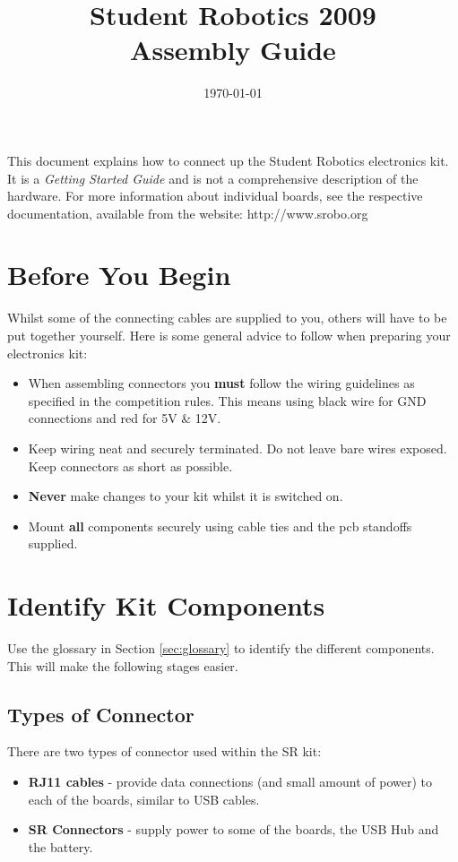\documentclass[a4paper, 12pt]{article}
\title {Student Robotics 2009\\ Assembly Guide}
\date{\today}
\begin{document}
\maketitle

\noindent This document explains how to connect up the Student Robotics electronics kit. It is a \textit{Getting Started Guide} and is not a comprehensive description of the hardware. For more information about individual boards, see the respective documentation, available from the website: http://www.srobo.org 

\section{Before You Begin}

Whilst some of the connecting cables are supplied to you, others will have to be put together yourself. Here is some general advice to follow when preparing your electronics kit:
\begin{itemize}
\item When assembling connectors you \textbf{must} follow the wiring guidelines as specified in the competition rules. This means using black wire for GND connections and red for 5V \& 12V. 
\item Keep wiring neat and securely terminated. Do not leave bare wires exposed. Keep connectors as short as possible.
\item \textbf{Never} make changes to your kit whilst it is switched on.
\item Mount \textbf{all} components securely using cable ties and the pcb standoffs supplied.

\end{itemize}


\section{Identify Kit Components}
Use the glossary in Section \ref{sec:glossary} to identify the different components. This will make the following stages easier.
\subsection{Types of Connector}
There are two types of connector used within the SR kit: 
\begin{itemize}
\item \textbf{RJ11 cables} - provide data connections (and small amount of power) to each of the boards, similar to USB cables. 
\item \textbf{SR Connectors} - supply power to some of the boards, the USB Hub and the battery.
\end{itemize} 
\end{document}
